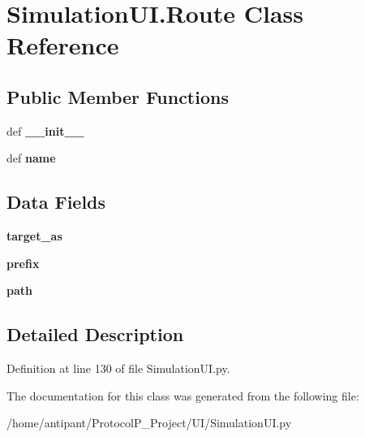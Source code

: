 \hypertarget{classSimulationUI_1_1Route}{\section{Simulation\-U\-I.\-Route Class Reference}
\label{classSimulationUI_1_1Route}
}
\subsection*{Public Member Functions}
\begin{DoxyCompactItemize}
\item 
\hypertarget{classSimulationUI_1_1Route_a9e161b3cd0875cea5c62b4b4af851ce8}{def {\bfseries \-\_\-\-\_\-init\-\_\-\-\_\-}}\label{classSimulationUI_1_1Route_a9e161b3cd0875cea5c62b4b4af851ce8}

\item 
\hypertarget{classSimulationUI_1_1Route_aeb39cfa548a2a6112041d2930874b593}{def {\bfseries name}}\label{classSimulationUI_1_1Route_aeb39cfa548a2a6112041d2930874b593}

\end{DoxyCompactItemize}
\subsection*{Data Fields}
\begin{DoxyCompactItemize}
\item 
\hypertarget{classSimulationUI_1_1Route_ad7c3293c79fb9a17a289a45661595c32}{{\bfseries target\-\_\-as}}\label{classSimulationUI_1_1Route_ad7c3293c79fb9a17a289a45661595c32}

\item 
\hypertarget{classSimulationUI_1_1Route_ac4542ce5b48705d71a694d74544d679e}{{\bfseries prefix}}\label{classSimulationUI_1_1Route_ac4542ce5b48705d71a694d74544d679e}

\item 
\hypertarget{classSimulationUI_1_1Route_af2476e912be995188b4c5420d5b9ef2f}{{\bfseries path}}\label{classSimulationUI_1_1Route_af2476e912be995188b4c5420d5b9ef2f}

\end{DoxyCompactItemize}


\subsection{Detailed Description}


Definition at line 130 of file Simulation\-U\-I.\-py.



The documentation for this class was generated from the following file\-:\begin{DoxyCompactItemize}
\item 
/home/antipant/\-Protocol\-P\-\_\-\-Project/\-U\-I/Simulation\-U\-I.\-py\end{DoxyCompactItemize}
